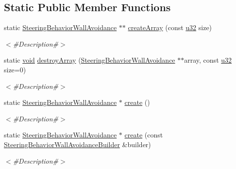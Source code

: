 \subsection*{Static Public Member Functions}
\begin{DoxyCompactItemize}
\item 
static \mbox{\hyperlink{classnjli_1_1_steering_behavior_wall_avoidance}{Steering\+Behavior\+Wall\+Avoidance}} $\ast$$\ast$ \mbox{\hyperlink{classnjli_1_1_steering_behavior_wall_avoidance_a484146269c83bea7aa24c1bd454c53b6}{create\+Array}} (const \mbox{\hyperlink{_util_8h_a10e94b422ef0c20dcdec20d31a1f5049}{u32}} size)
\begin{DoxyCompactList}\small\item\em $<$\#\+Description\#$>$ \end{DoxyCompactList}\item 
static \mbox{\hyperlink{_thread_8h_af1e856da2e658414cb2456cb6f7ebc66}{void}} \mbox{\hyperlink{classnjli_1_1_steering_behavior_wall_avoidance_ad0611cffe1596661f9ac36ccca8226fb}{destroy\+Array}} (\mbox{\hyperlink{classnjli_1_1_steering_behavior_wall_avoidance}{Steering\+Behavior\+Wall\+Avoidance}} $\ast$$\ast$array, const \mbox{\hyperlink{_util_8h_a10e94b422ef0c20dcdec20d31a1f5049}{u32}} size=0)
\begin{DoxyCompactList}\small\item\em $<$\#\+Description\#$>$ \end{DoxyCompactList}\item 
static \mbox{\hyperlink{classnjli_1_1_steering_behavior_wall_avoidance}{Steering\+Behavior\+Wall\+Avoidance}} $\ast$ \mbox{\hyperlink{classnjli_1_1_steering_behavior_wall_avoidance_aa7933927d90b5a7d016a930bd2c2f53d}{create}} ()
\begin{DoxyCompactList}\small\item\em $<$\#\+Description\#$>$ \end{DoxyCompactList}\item 
static \mbox{\hyperlink{classnjli_1_1_steering_behavior_wall_avoidance}{Steering\+Behavior\+Wall\+Avoidance}} $\ast$ \mbox{\hyperlink{classnjli_1_1_steering_behavior_wall_avoidance_a08f48cf4170880875c3c32e8ffd28136}{create}} (const \mbox{\hyperlink{classnjli_1_1_steering_behavior_wall_avoidance_builder}{Steering\+Behavior\+Wall\+Avoidance\+Builder}} \&builder)
\begin{DoxyCompactList}\small\item\em $<$\#\+Description\#$>$ \end{DoxyCompactList}\item 

\end{DoxyCompactItemize}
